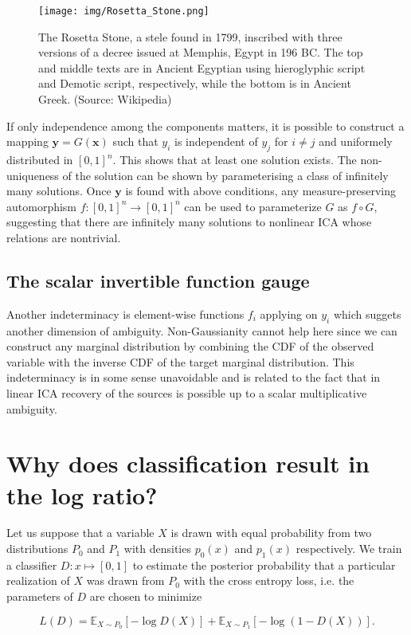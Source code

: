 \begin{figure}[t!]
    \centering
    \texttt{[image: img/Rosetta\_Stone.png]}
    \caption{The Rosetta Stone, a stele found in 1799, inscribed with three versions of a decree issued at Memphis, Egypt in 196 BC. The top and middle texts are in Ancient Egyptian using hieroglyphic script and Demotic script, respectively, while the bottom is in Ancient Greek. (Source: Wikipedia)}
    \label{fig:rosetta}
\end{figure}
If only independence among the components matters, it is possible to construct a mapping $\bm{y}=G(\bm{x})$ such that $y_i$ is independent of $y_j$ for $i\neq j$ and uniformely distributed in $[0,1]^n$. This shows that at least one solution exists. The non-uniqueness of the solution can be shown by parameterising a class of infinitely many solutions. Once $\bm{y}$ is found with above conditions, any measure-preserving automorphism $f:[0,1]^n\to[0,1]^n$ can be used to parameterize $G$ as $f\circ G$, suggesting that there are infinitely many solutions to nonlinear ICA whose relations are nontrivial.
\subsection{The scalar invertible function gauge}
\label{sec:gauge}
Another indeterminacy is element-wise functions $f_i$ applying on $y_i$ which suggets another dimension of ambiguity. Non-Gaussianity cannot help here since we can construct any marginal distribution by combining the CDF of the observed variable with the inverse CDF of the target marginal distribution. This indeterminacy is in some sense unavoidable and is related to the fact that in linear ICA recovery of the sources is possible up to a scalar multiplicative ambiguity.

\section{Why does classification result in the log ratio?}
\label{sec:converged}
Let us suppose that a variable $X$ is drawn with equal probability from two distributions $P_0$ and $P_1$ with densities $p_0(x)$ and $p_1(x)$ respectively.
We train a classifier $D: x \mapsto [0,1]$ to estimate the posterior probability that a particular realization of $X$ was drawn from $P_0$ with the cross entropy loss, i.e. the parameters of $D$ are chosen to minimize

\[
L(D) = \mathbb{E}_{X\sim P_0} \left[ - \log D(X) \right] + \mathbb{E}_{X\sim P_1} \left[ - \log (1 - D(X)) \right].
\]

